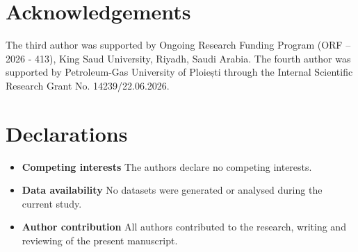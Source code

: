 \documentclass[12pt]{amsart}
\begin{document}
\section*{Acknowledgements}
The third author was supported by Ongoing Research
Funding Program (ORF -- 2026 - 413), King Saud University, Riyadh, Saudi
Arabia. The fourth author was supported by Petroleum-Gas University of Ploiești through the Internal Scientific Research Grant No. 14239/22.06.2026.

\section*{Declarations}

\begin{itemize}
\item \textbf{Competing interests} The authors declare no competing interests.
\item \textbf{Data availability} No datasets were generated or analysed during the current study.
\item \textbf{Author contribution} All authors contributed to the research, writing and reviewing of the present
manuscript.
\end{itemize}
\end{document}
